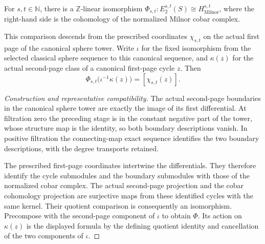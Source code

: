 \begin{definition}
\label{frontier:AdamsSynthetic:8b66ee46e41e}
For $s,t\in\mathbb N$, there is a $\mathbb Z$-linear isomorphism
$\Phi_{s,t}\colon E_2^{s,t}(S)\cong H^{s,t}_{\mathrm{Milnor}}$, where the
right-hand side is the cohomology of the normalized Milnor cobar complex.

This comparison descends from the prescribed coordinates $\chi_{s,t}$
on the actual first page of the canonical sphere tower. Write $\iota$
for the fixed isomorphism from the selected classical sphere sequence
to this canonical sequence, and $\kappa(z)$ for the actual second-page
class of a canonical first-page cycle $z$. Then
\[
\Phi_{s,t}\bigl(\iota^{-1}\kappa(z)\bigr)=[\chi_{s,t}(z)].
\]
\end{definition}
\begin{proof}[Construction and representative compatibility]
The actual second-page boundaries in the canonical sphere tower are
exactly the image of its first differential. At filtration zero the
preceding stage is in the constant negative part of the tower, whose
structure map is the identity, so both boundary descriptions vanish.
In positive filtration the connecting-map exact sequence identifies
the two boundary descriptions, with the degree transports retained.

The prescribed first-page coordinates intertwine the differentials.
They therefore identify the cycle submodules and the boundary
submodules with those of the normalized cobar complex. The actual
second-page projection and the cobar cohomology projection are
surjective maps from these identified cycles with the same kernel.
Their quotient comparison is consequently an isomorphism. Precompose
with the second-page component of $\iota$ to obtain $\Phi$. Its action
on $\kappa(z)$ is the displayed formula by the defining quotient
identity and cancellation of the two components of $\iota$.
\end{proof}

